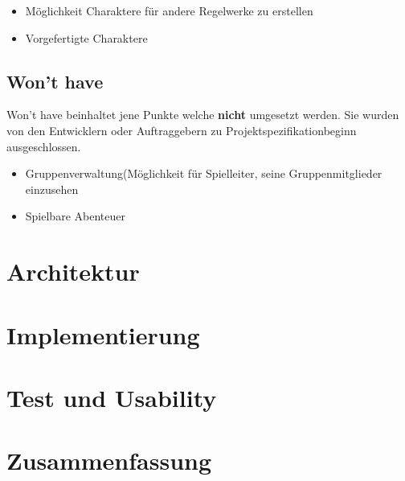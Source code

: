 \begin{itemize}
	\item Möglichkeit Charaktere für andere Regelwerke zu erstellen
	\item Vorgefertigte Charaktere
\end{itemize}

\subsection{Won't have}

\grqq Won't have\grqq{} beinhaltet jene Punkte welche \textbf{nicht} umgesetzt werden. Sie wurden von den Entwicklern oder Auftraggebern zu Projektspezifikationbeginn ausgeschlossen.

\begin{itemize}
	\item Gruppenverwaltung(Möglichkeit für Spielleiter, seine Gruppenmitglieder einzusehen
	\item Spielbare Abenteuer
\end{itemize}

\section{Architektur}

\section{Implementierung}

\section{Test und Usability}

\section{Zusammenfassung}